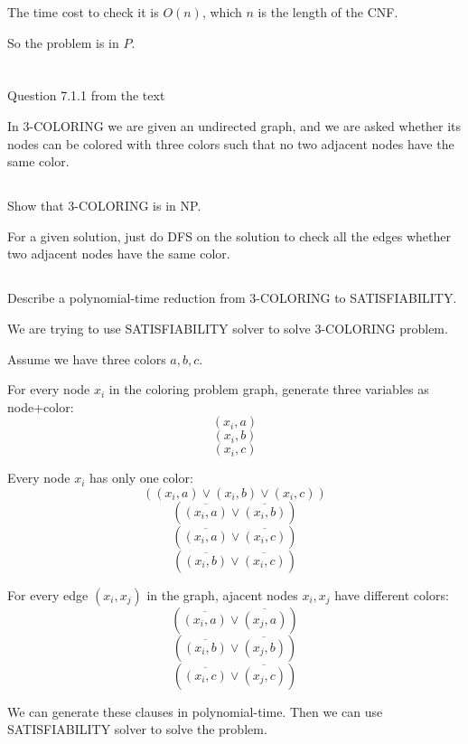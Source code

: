 \documentclass[paper=a4, fontsize=11pt]{scrartcl} %
\begin{document}
The time cost to check it is $O(n)$, which $n$ is the length of the
CNF\@.

So the problem is in $P$.

\pagebreak

\section{}

\begin{fancyquotes}
   Question 7.1.1 from the text

   In 3-COLORING we are given an undirected graph, and we are asked
   whether its nodes can be colored with three colors such that no two
   adjacent nodes have the same color.
\end{fancyquotes}

\subsection{}
\begin{fancyquotes}
  Show that 3-COLORING is in NP\@.
\end{fancyquotes}

For a given solution, just do DFS on the solution to check all the
edges whether two adjacent nodes have the same color.

\subsection{}
\begin{fancyquotes}
  Describe a polynomial-time reduction from 3-COLORING to
  SATISFIABILITY\@.
\end{fancyquotes}

We are trying to use SATISFIABILITY solver to solve 3-COLORING
problem.

Assume we have three colors $a,b,c$.

For every node $x_i$ in the coloring problem graph,
generate three variables as node+color:
$$(x_i, a)$$
$$(x_i, b)$$
$$(x_i, c)$$

Every node $x_i$ has only one color:
$$((x_i,a) \vee (x_i,b) \vee (x_i,c))$$
$$(\overline{(x_i,a)} \vee \overline{(x_i,b)})$$
$$(\overline{(x_i,a)} \vee \overline{(x_i,c)})$$
$$(\overline{(x_i,b)} \vee \overline{(x_i,c)})$$

For every edge $(x_i,x_j)$ in the graph,
ajacent nodes $x_i, x_j$ have different colors:
$$(\overline{(x_i,a)} \vee \overline{(x_j,a)})$$
$$(\overline{(x_i,b)} \vee \overline{(x_j,b)})$$
$$(\overline{(x_i,c)} \vee \overline{(x_j,c)})$$

We can generate these clauses in polynomial-time.
Then we can use SATISFIABILITY solver to solve the problem.

\pagebreak
\end{document}
